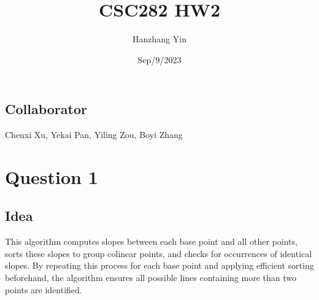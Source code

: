 \documentclass{article}
\title{CSC282 HW2}
\author{Hanzhang Yin}
\date{Sep/9/2023}
\begin{document}
\maketitle

\subsection*{Collaborator}
Chenxi Xu, Yekai Pan, Yiling Zou, Boyi Zhang

\section*{Question 1}

\subsection*{Idea}
This algorithm computes slopes between each base point and all other points, sorts these slopes to group colinear points, and checks for occurrences of identical slopes. By repeating this process for each base point and applying efficient sorting beforehand, the algorithm ensures all possible lines containing more than two points are identified.
\end{document}
